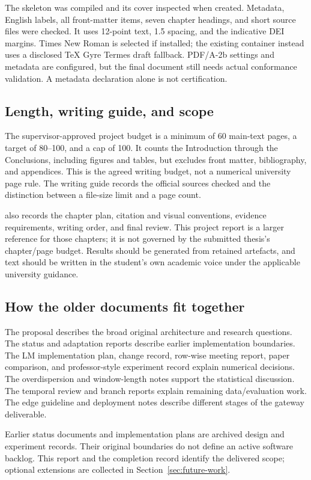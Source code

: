The skeleton was compiled and its cover inspected when created. Metadata,
English labels, all front-matter items, seven chapter headings, and short
source files were checked. It uses 12-point text, 1.5 spacing, and the indicative
DEI margins. Times New Roman is selected if installed; the existing container
instead uses a disclosed TeX Gyre Termes draft fallback. PDF/A-2b settings and
metadata are configured, but the final document still needs actual conformance
validation. A metadata declaration alone is not certification.

\subsection{Length, writing guide, and scope}

The supervisor-approved project budget is a minimum of 60 main-text pages,
a target of 80--100, and a cap of 100. It counts the Introduction through the
Conclusions, including figures and tables, but excludes front matter,
bibliography, and appendices. This is the agreed writing budget, not a numerical
university page rule. The writing guide records the official sources checked
and the distinction between a file-size limit and a page count.

 also records the chapter plan, citation and
visual conventions, evidence requirements, writing order, and final review.
This project report is a larger reference for those chapters; it is not
governed by the submitted thesis's chapter/page budget. Results should be
generated from retained artefacts, and text should be written in the student's
own academic voice under the applicable university guidance.

\subsection{How the older documents fit together}

The proposal describes the broad original architecture and research questions.
The status and adaptation reports describe earlier implementation boundaries.
The LM implementation plan, change record, row-wise meeting report, paper
comparison, and professor-style experiment record explain numerical decisions.
The overdispersion and window-length notes support the statistical discussion.
The temporal review and branch reports explain remaining data/evaluation work.
The edge guideline and deployment notes describe different stages of the
gateway deliverable.

Earlier status documents and implementation plans are archived design and
experiment records. Their original boundaries do not define an active software
backlog. This report and the completion record identify the delivered scope;
optional extensions are collected in Section~\ref{sec:future-work}.
